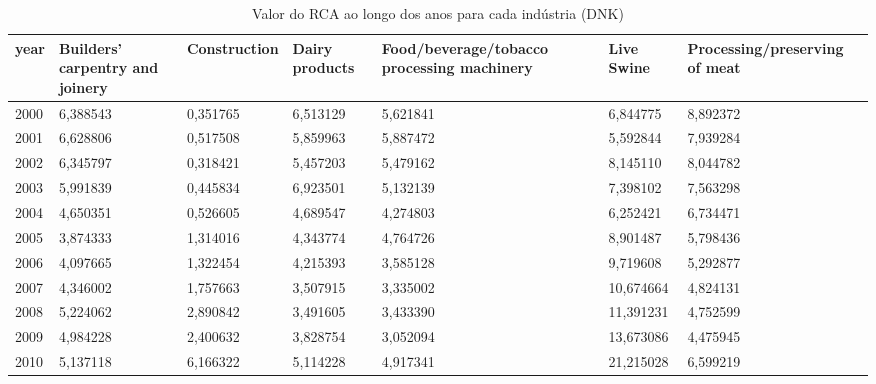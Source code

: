 \begin{table}
\centering
\caption{Valor do RCA ao longo dos anos para cada indústria (DNK)}
\begin{tabular}{p{1cm}p{2cm}p{2cm}p{2cm}p{2cm}p{2cm}p{2cm}}
\toprule
 year &  Builders' carpentry and joinery &  Construction &  Dairy products &  Food/beverage/tobacco processing machinery &  Live Swine &  Processing/preserving of meat \\
\midrule
 2000 &                         6,388543 &      0,351765 &        6,513129 &                                    5,621841 &    6,844775 &                       8,892372 \\
 2001 &                         6,628806 &      0,517508 &        5,859963 &                                    5,887472 &    5,592844 &                       7,939284 \\
 2002 &                         6,345797 &      0,318421 &        5,457203 &                                    5,479162 &    8,145110 &                       8,044782 \\
 2003 &                         5,991839 &      0,445834 &        6,923501 &                                    5,132139 &    7,398102 &                       7,563298 \\
 2004 &                         4,650351 &      0,526605 &        4,689547 &                                    4,274803 &    6,252421 &                       6,734471 \\
 2005 &                         3,874333 &      1,314016 &        4,343774 &                                    4,764726 &    8,901487 &                       5,798436 \\
 2006 &                         4,097665 &      1,322454 &        4,215393 &                                    3,585128 &    9,719608 &                       5,292877 \\
 2007 &                         4,346002 &      1,757663 &        3,507915 &                                    3,335002 &   10,674664 &                       4,824131 \\
 2008 &                         5,224062 &      2,890842 &        3,491605 &                                    3,433390 &   11,391231 &                       4,752599 \\
 2009 &                         4,984228 &      2,400632 &        3,828754 &                                    3,052094 &   13,673086 &                       4,475945 \\
 2010 &                         5,137118 &      6,166322 &        5,114228 &                                    4,917341 &   21,215028 &                       6,599219 \\

\end{tabular}
\end{table}
